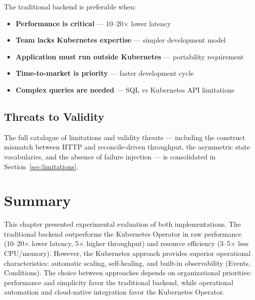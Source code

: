 The traditional backend is preferable when:

\begin{itemize}
    \item \textbf{Performance is critical} --- 10--20$\times$ lower latency
    \item \textbf{Team lacks Kubernetes expertise} --- simpler development model
    \item \textbf{Application must run outside Kubernetes} --- portability requirement
    \item \textbf{Time-to-market is priority} --- faster development cycle
    \item \textbf{Complex queries are needed} --- SQL vs Kubernetes API limitations
\end{itemize}

\subsection{Threats to Validity}

The full catalogue of limitations and validity threats --- including the construct mismatch between HTTP and reconcile-driven throughput, the asymmetric state vocabularies, and the absence of failure injection --- is consolidated in Section~\ref{sec:limitations}.

\section{Summary}

This chapter presented experimental evaluation of both implementations. The traditional backend outperforms the Kubernetes Operator in raw performance (10--20$\times$ lower latency, 5$\times$ higher throughput) and resource efficiency (3--5$\times$ less CPU/memory). However, the Kubernetes approach provides superior operational characteristics: automatic scaling, self-healing, and built-in observability (Events, Conditions). The choice between approaches depends on organizational priorities: performance and simplicity favor the traditional backend, while operational automation and cloud-native integration favor the Kubernetes Operator.
